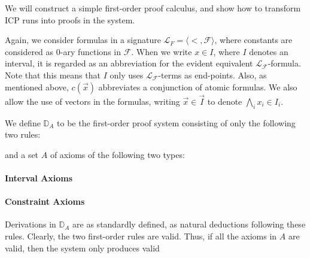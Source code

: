 \documentclass[envcountsect]{llncs}
\begin{document}
We will construct a simple first-order proof calculus, and show how to
transform ICP runs into proofs in the system.

Again, we consider formulas in a signature $\mathcal{L}_F = \langle <,
\mathcal{F} \rangle$, where constants are considered as 0-ary functions in
$\mathcal{F}$. When we write $x\in I$, where $I$ denotes an
interval, it is regarded as an abbreviation for the evident
equivalent $\mathcal{L}_\mathcal{F}$-formula. Note that this means that $I$ only
uses $\mathcal{L}_{\mathcal{F}}$-terms as end-points. Also, as mentioned above,
$c(\vec x)$ abbreviates a conjunction of atomic formulas. We also allow the use
of vectors in the formulas, writing $\vec x\in \vec I$ to denote $\bigwedge_i
x_i\in I_i$.

\begin{definition}
We define $\mathbb{D}_A$ to be the first-order proof system consisting of only the
following two rules:
and a set $A$ of axioms of the following two types:
\paragraph{Interval Axioms}
\begin{mathpar}
\end{mathpar}
\paragraph{Constraint Axioms}
\begin{mathpar}
\end{mathpar}
\end{definition}
Derivations in $\mathbb{D}_A$ are as standardly defined, as natural deductions
following these rules. Clearly, the two first-order rules are valid. Thus,
if all the axioms in $A$ are valid, then the system only produces valid
\end{document}
